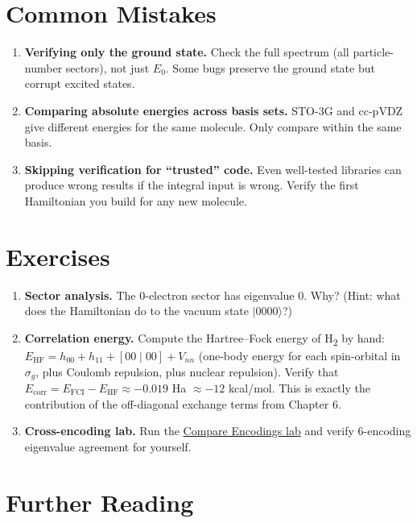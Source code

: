 \documentclass[
  11pt,
  oneside]{book}
\begin{document}
\section{Common Mistakes}\label{common-mistakes-7}

\begin{enumerate}
\def\labelenumi{\arabic{enumi}.}
\item
  \textbf{Verifying only the ground state.} Check the full spectrum (all
  particle-number sectors), not just \(E_0\). Some bugs preserve the
  ground state but corrupt excited states.
\item
  \textbf{Comparing absolute energies across basis sets.} STO-3G and
  cc-pVDZ give different energies for the same molecule. Only compare
  within the same basis.
\item
  \textbf{Skipping verification for ``trusted'' code.} Even well-tested
  libraries can produce wrong results if the integral input is wrong.
  Verify the first Hamiltonian you build for any new molecule.
\end{enumerate}

\section{Exercises}\label{exercises-8}

\begin{enumerate}
\def\labelenumi{\arabic{enumi}.}
\item
  \textbf{Sector analysis.} The 0-electron sector has eigenvalue 0. Why?
  (Hint: what does the Hamiltonian do to the vacuum state
  \(\lvert 0000\rangle\)?)
\item
  \textbf{Correlation energy.} Compute the Hartree--Fock energy of H\textsubscript{2} by
  hand: \(E_\text{HF} = h_{00} + h_{11} + [00\mid00] + V_{nn}\)
  (one-body energy for each spin-orbital in \(\sigma_g\), plus Coulomb
  repulsion, plus nuclear repulsion). Verify that
  \(E_\text{corr} = E_\text{FCI} - E_\text{HF} \approx -0.019\) Ha
  \(\approx -12\) kcal/mol. This is exactly the contribution of the
  off-diagonal exchange terms from Chapter 6.
\item
  \textbf{Cross-encoding lab.} Run the
  \href{../labs/03-compare-encodings.html}{Compare Encodings lab} and
  verify 6-encoding eigenvalue agreement for yourself.
\end{enumerate}

\section{Further Reading}\label{further-reading-8}
\end{document}
